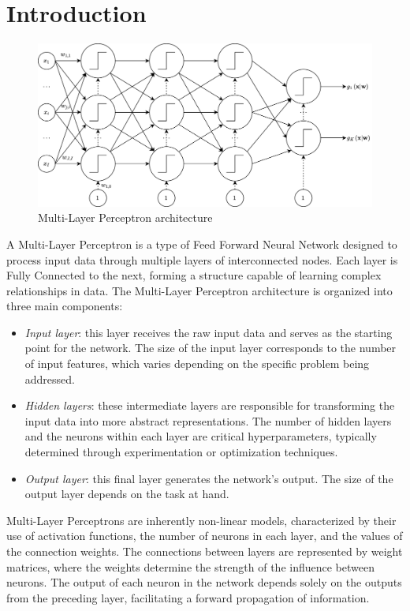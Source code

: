 \section{Introduction}

\begin{figure}[H]
    \centering
    \includegraphics[width=0.75\linewidth]{images/ffnn.png}
    \caption{Multi-Layer Perceptron architecture}
\end{figure}
A Multi-Layer Perceptron is a type of Feed Forward Neural Network designed to process input data through multiple layers of interconnected nodes.
Each layer is Fully Connected to the next, forming a structure capable of learning complex relationships in data.
The Multi-Layer Perceptron architecture is organized into three main components:
\begin{itemize}
    \item \textit{Input layer}: this layer receives the raw input data and serves as the starting point for the network. 
        The size of the input layer corresponds to the number of input features, which varies depending on the specific problem being addressed.
    \item \textit{Hidden layers}: these intermediate layers are responsible for transforming the input data into more abstract representations.
        The number of hidden layers and the neurons within each layer are critical hyperparameters, typically determined through experimentation or optimization techniques.
    \item \textit{Output layer}: this final layer generates the network's output.
        The size of the output layer depends on the task at hand.
\end{itemize}
Multi-Layer Perceptrons are inherently non-linear models, characterized by their use of activation functions, the number of neurons in each layer, and the values of the connection weights.
The connections between layers are represented by weight matrices, where the weights determine the strength of the influence between neurons. 
The output of each neuron in the network depends solely on the outputs from the preceding layer, facilitating a forward propagation of information.
